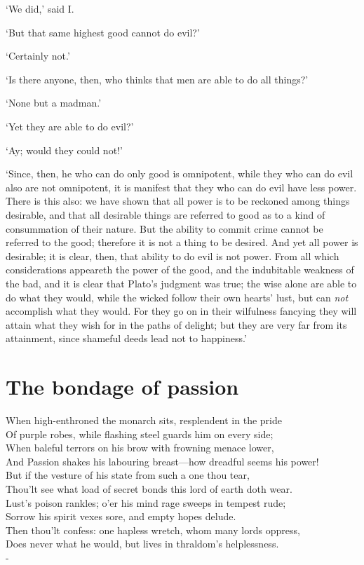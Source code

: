 \documentclass[12pt]{book}
\newenvironment{ipoem}[1]%
  {\setcounter{poemindentevery}{#1}\begin{poem}\small}%
  {\end{poem}\setcounter{poemindentevery}{0}}
\begin{document}
`We did,' said I.

`But that same highest good cannot do evil?'

`Certainly not.'

`Is there anyone, then, who thinks that men are able to do all things?'

`None but a madman.'

`Yet they are able to do evil?'

`Ay; would they could not!'

`Since, then, he who can do only good is omnipotent, while they who can
do evil also are not omnipotent, it is manifest that they who can do
evil have less power. There is this also: we have shown that all power
is to be reckoned among things desirable, and that all desirable things
are referred to good as to a kind of consummation of their nature. But
the ability to commit crime cannot be referred to the good; therefore it
is not a thing to be desired. And yet all power is desirable; it is
clear, then, that ability to do evil is not power. From all which
considerations appeareth the power of the good, and the indubitable
weakness of the bad, and it is clear that Plato's judgment was true; the
wise alone are able to do what they would, while the wicked follow their
own hearts' lust, but can \emph{not} accomplish what they would. For they go
on in their wilfulness fancying they will attain what they wish for in
the paths of delight; but they are very far from its attainment, since
shameful deeds lead not to happiness.'



\section{The bondage of passion}

\begin{ipoem}{0}
    When high-enthroned the monarch sits, resplendent in the pride \\
    Of purple robes, while flashing steel guards him on every side; \\
    When baleful terrors on his brow with frowning menace lower, \\
    And Passion shakes his labouring breast---how dreadful seems his power! \\
    But if the vesture of his state from such a one thou tear, \\
    Thou'lt see what load of secret bonds this lord of earth doth wear. \\
    Lust's poison rankles; o'er his mind rage sweeps in tempest rude; \\
    Sorrow his spirit vexes sore, and empty hopes delude. \\
    Then thou'lt confess: one hapless wretch, whom many lords oppress, \\
    Does never what he would, but lives in thraldom's helplessness. \\-
\end{ipoem}
\end{document}
